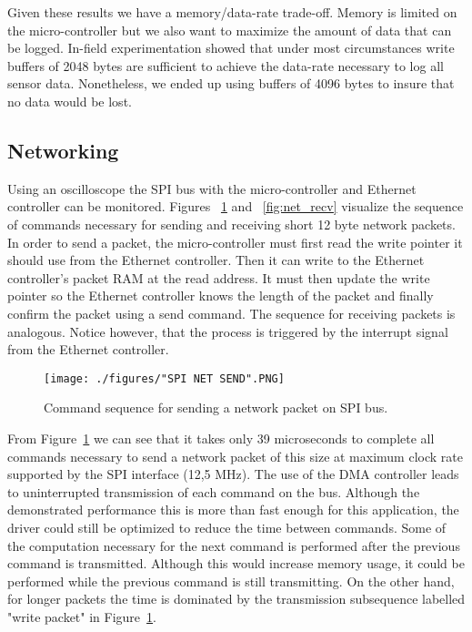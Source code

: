 Given these results we have a memory/data-rate trade-off. Memory is limited on the micro-controller but we also want to maximize the amount of data that can be logged. In-field experimentation showed that under most circumstances write buffers of 2048 bytes are sufficient to achieve the data-rate necessary to log all sensor data. Nonetheless, we ended up using buffers of 4096 bytes to insure that no data would be lost.

\subsection{Networking}

Using an oscilloscope the SPI bus with the micro-controller and Ethernet controller can be monitored. Figures ~\ref{fig:net_send} and ~\ref{fig:net_recv} visualize the sequence of commands necessary for sending and receiving short 12 byte network packets. In order to send a packet, the micro-controller must first read the write pointer it should use from the Ethernet controller. Then it can write to the Ethernet controller's packet RAM at the read address. It must then update the write pointer so the Ethernet controller knows the length of the packet and finally confirm the packet using a send command. The sequence for receiving packets is analogous. Notice however, that the process is triggered by the interrupt signal from the Ethernet controller.

\begin{figure}[H]
    \centering \texttt{[image: ./figures/"SPI NET SEND".PNG]}
    \caption{Command sequence for sending a network packet on SPI bus.}
    \label{fig:net_send}
\end{figure}

From Figure~\ref{fig:net_send} we can see that it takes only 39 microseconds to complete all commands necessary to send a network packet of this size at maximum clock rate supported by the SPI interface (12,5 MHz). The use of the DMA controller leads to uninterrupted transmission of each command on the bus. Although the demonstrated performance this is more than fast enough for this application, the driver could still be optimized to reduce the time between commands. Some of the computation necessary for the next command is performed after the previous command is transmitted. Although this would increase memory usage, it could be performed while the previous command is still transmitting. On the other hand, for longer packets the time is dominated by the transmission subsequence labelled "write packet" in Figure~\ref{fig:net_send}.

